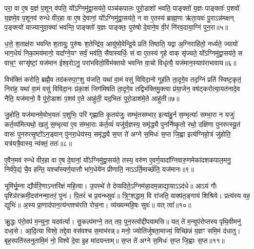{\anuvakamend[{अशी॑यत॒ तत् तेन॒ वेद॑ द॒र्भैः पञ्च॑विꣳशतिश्च॥१॥}]}

परा॒ वा ए॒ष य॒ज्ञं प॒शून् व॑पति॒ यो᳚\-ऽग्निमु॑द्वा॒सय॑ते॒ पञ्च॑कपालः पुरो॒डाशो॑ भवति॒ पाङ्क्तो॑ य॒ज्ञः पाङ्क्ताः᳚ प॒शवो॑ य॒ज्ञमे॒व प॒शूनव॑ रुन्धे वीर॒हा वा ए॒ष दे॒वानां॒ यो᳚\-ऽग्निमु॑द्वा॒सय॑ते॒ न वा ए॒तस्य॑ ब्राह्म॒णा ऋ॑ता॒यवः॑ पु॒रा\-ऽन्न॑मक्षन् प॒ङ्क्त्यो॑ याज्यानुवा॒क्या॑ भवन्ति॒ पाङ्क्तो॑ य॒ज्ञः पाङ्क्तः॒ पुरु॑षो दे॒वाने॒व वी॒रं नि॑रव॒दाया॒ग्निं पुन॒रा॥५॥

ध॒त्ते॒ श॒ताक्ष॑रा भवन्ति श॒तायुः॒ पुरु॑षः श॒तेन्द्रि॑य॒ आयु॑ष्ये॒वेन्द्रि॒ये प्रति॑ तिष्ठति॒ यद्वा अ॒ग्निराहि॑तो॒ नर्ध्यते॒ ज्यायो॑ भाग॒धेयं॑ निका॒मय॑मानो॒ यदा᳚ग्ने॒यꣳ सर्वं॒ भव॑ति॒ सैवास्यर्धिः॒ सं वा ए॒तस्य॑ गृ॒हे वाक् सृ॑ज्यते॒ यो᳚\-ऽग्निमु॑द्वा॒सय॑ते॒ स वाच॒ꣳ॒ सꣳसृ॑ष्टां॒ यज॑मान ईश्व॒रो\-ऽनु॒ परा॑भवितो॒र्विभ॑क्तयो भवन्ति वा॒चो विधृ॑त्यै॒ यज॑मान॒स्याप॑राभावाय॥६॥

विभ॑क्तिं करोति॒ ब्रह्मै॒व तद॑करुपा॒ꣳ॒शु य॑जति॒ यथा॑ वा॒मं वसु॑ विविदा॒नो गूह॑ति ता॒दृगे॒व तद॒ग्निं प्रति॑ स्विष्ट॒कृतं॒ निरा॑ह॒ यथा॑ वा॒मं वसु॑ विविदा॒नः प्र॑का॒शं जिग॑मिषति ता॒दृगे॒व तद्विभ॑क्तिमु॒क्त्वा प्र॑या॒जेन॒ वष॑ट्करोत्या॒यत॑नादे॒व नैति॒ यज॑मानो॒ वै पु॑रो॒डाशः॑ प॒शव॑ ए॒ते आहु॑ती॒ यद॒भितः॑ पुरो॒डाश॑मे॒ते आहु॑ती॥७॥

जु॒होति॒ यज॑मानमे॒वोभ॒यतः॑ प॒शुभिः॒ परि॑ गृह्णाति कृ॒तय॑जुः॒ सम्भृ॑तसम्भार॒ इत्या॑हु॒र्न स॒म्भृत्याः᳚ सम्भा॒रा न यजुः॑ कर्त॒व्य॑मित्यथो॒ खलु॑ स॒म्भृत्या॑ ए॒व स॑म्भा॒राः क॑र्त॒व्यं॑ यजु॑र्य॒ज्ञस्य॒ समृ॑द्ध्यै पुनर्निष्कृ॒तो रथो॒ दक्षि॑णा पुनरुत्स्यू॒तं वासः॑ पुनरुत्सृ॒ष्टो॑\-ऽन॒ड्वान् पु॑नरा॒धेय॑स्य॒ समृ॑द्ध्यै स॒प्त ते॑ अग्ने स॒मिधः॑ स॒प्त जि॒ह्वा इत्य॑ग्निहो॒त्रं जु॑होति॒ यत्र॑यत्रै॒वास्य॒ न्य॑क्तं॒ ततः॑॥८॥

ए॒वैन॒मव॑ रुन्धे वीर॒हा वा ए॒ष दे॒वानां॒ यो᳚\-ऽग्निमु॑द्वा॒सय॑ते॒ तस्य॒ वरु॑ण ए॒वर्ण॒यादा᳚ग्निवारु॒णमेका॑दशकपाल॒मनु॒ निर्व॑पे॒द्यं चै॒व हन्ति॒ यश्चा᳚स्यर्ण॒यात्तौ भा॑ग॒धेये॑न प्रीणाति॒ ना\-ऽ\-ऽर्ति॒मार्च्छ॑ति॒ यज॑मानः॥९॥

{\anuvakamend[{आ\-ऽप॑राभावाय पुरो॒डाश॑मे॒ते आहु॑ती॒ तत॒ष्षट्त्रिꣳ॑शच्च॥२॥}]}

भूमि॑र्भू॒म्ना द्यौर्व॑रि॒णा\-ऽन्तरि॑क्षं महि॒त्वा। उ॒पस्थे॑ ते देव्यदिते॒\-ऽग्निम॑न्ना॒दम॒न्नाद्या॒या\-ऽ\-ऽद॑धे॥ आ\-ऽयं गौः पृश्ञि॑रक्रमी॒दस॑नन्मा॒तरं॒ पुनः॑। पि॒तरं॑ च प्र॒यन्थ्सुवः॑॥ त्रि॒ꣳ॒शद्धाम॒ वि रा॑जति॒ वाक्प॑त॒ङ्गाय॑ शिश्रिये। प्रत्य॑स्य वह॒ द्युभिः॑॥ अ॒स्य प्रा॒णाद॑पान॒त्य॑न्तश्च॑रति रोच॒ना। व्य॑ख्यन्महि॒षः सुवः॑॥ यत् त्वा᳚॥१०॥

क्रु॒द्धः प॑रो॒वप॑ म॒न्युना॒ यदव॑र्त्या। सु॒कल्प॑मग्ने॒ तत् तव॒ पुन॒स्त्वोद्दी॑पयामसि॥ यत् ते॑ म॒न्युप॑रोप्तस्य पृथि॒वीमनु॑ दध्व॒से। आ॒दि॒त्या विश्वे॒ तद्दे॒वा वस॑वश्च स॒माभ॑रन्न्॥ मनो॒ ज्योति॑र्जुषता॒माज्यं॒ विच्छि॑न्नं य॒ज्ञꣳ समि॒मं द॑धातु। बृह॒स्पति॑स्तनुतामि॒मं नो॒ विश्वे॑ दे॒वा इ॒ह मा॑दयन्ताम्॥ स॒प्त ते॑ अग्ने स॒मिधः॑ स॒प्त जि॒ह्वाः स॒प्त॥११॥

